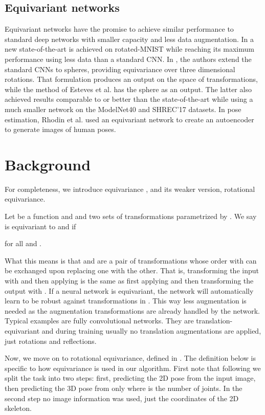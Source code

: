 \documentclass[preprint]{elsarticle}
\begin{document}
\subsection{Equivariant networks}
Equivariant networks have the promise to achieve similar performance to standard deep networks with smaller capacity and less data augmentation. In \cite{worrall2016harmonic} a new state-of-the-art is achieved on rotated-MNIST \cite{rotatedMNIST} while reaching its maximum performance using less data than a standard CNN. In \cite{cohen2018spherical}, the authors extend the standard CNNs to spheres, providing equivariance over three dimensional rotations. That formulation produces an output on the space of transformations, while the method of Esteves et al. \cite{esteves2018so3equivariance} has the sphere as an output. The latter also achieved results comparable to or better than the state-of-the-art while using a much smaller network on the ModelNet40 \cite{modelnet40} and SHREC'17 \cite{shrec17} datasets. In pose estimation, Rhodin et al. \cite{helge_geometry-aware} used an equivariant network to create an autoencoder to generate images of human poses.

\section{Background}
For completeness, we introduce equivariance \cite{worall2017interpretable}, and its weaker version, rotational equivariance.
\begin{definition} Let  be a function and  and  two sets of transformations parametrized by . We say  is equivariant to  and  if

for all  and .
\end{definition}
What this means is that  and  are a pair of transformations whose order with   can be exchanged upon replacing one with the other.
That is, transforming the input with  and then applying  is the same as first applying  and then transforming the output with . If a neural network is equivariant, the network will automatically learn to be robust against transformations in . This way less augmentation is needed as the augmentation transformations are already handled by the network. Typical examples are fully convolutional networks. They are translation-equivariant and during training usually no translation augmentations are applied, just rotations and reflections.

Now, we move on to rotational equivariance, defined in \cite{helge_geometry-aware}. The definition  below is specific to how equivariance is used in our algorithm. First note that following \cite{3dbaseline} we split the task into two steps: first, predicting the 2D pose  from the input image, then predicting the 3D pose  from  only where  is the number of joints. In the second step no image information was used, just the coordinates of the 2D skeleton.
\end{document}
